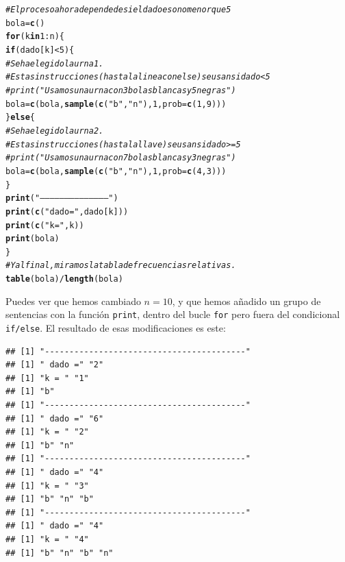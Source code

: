 \documentclass[10pt,a4paper]{article}\usepackage[]{graphicx}\usepackage[]{color}
\makeatletter
\newcommand{\hlnum}[1]{\textcolor[rgb]{0.686,0.059,0.569}{#1}}%
\newcommand{\hlstr}[1]{\textcolor[rgb]{0.192,0.494,0.8}{#1}}%
\newcommand{\hlcom}[1]{\textcolor[rgb]{0.678,0.584,0.686}{\textit{#1}}}%
\newcommand{\hlopt}[1]{\textcolor[rgb]{0,0,0}{#1}}%
\newcommand{\hlstd}[1]{\textcolor[rgb]{0.345,0.345,0.345}{#1}}%
\newcommand{\hlkwa}[1]{\textcolor[rgb]{0.161,0.373,0.58}{\textbf{#1}}}%
\newcommand{\hlkwb}[1]{\textcolor[rgb]{0.69,0.353,0.396}{#1}}%
\newcommand{\hlkwc}[1]{\textcolor[rgb]{0.333,0.667,0.333}{#1}}%
\newcommand{\hlkwd}[1]{\textcolor[rgb]{0.737,0.353,0.396}{\textbf{#1}}}%
\newenvironment{kframe}{%
 \def\at@end@of@kframe{}%
 \ifinner\ifhmode%
  \def\at@end@of@kframe{\end{minipage}}%
  \begin{minipage}{\columnwidth}%
 \fi\fi%
 \def\FrameCommand##1{\hskip\@totalleftmargin \hskip-\fboxsep
 \colorbox{shadecolor}{##1}\hskip-\fboxsep
     \hskip-\linewidth \hskip-\@totalleftmargin \hskip\columnwidth}%
 \MakeFramed {\advance\hsize-\width
   \@totalleftmargin\z@ \linewidth\hsize
   \@setminipage}}%
 {\par\unskip\endMakeFramed%
 \at@end@of@kframe}
\newenvironment{knitrout}{}{} %
\makeatother
\begin{document}
\begin{enumerate}
\begin{knitrout}
\begin{kframe}
\begin{alltt}
\hlcom{# El proceso ahora depende de si el dado es o no menor que 5}
\hlstd{bola}\hlkwb{=}\hlkwd{c}\hlstd{()}
\hlkwa{for}\hlstd{(k} \hlkwa{in} \hlnum{1}\hlopt{:}\hlstd{n)\{}
  \hlkwa{if}\hlstd{(dado[k]} \hlopt{<} \hlnum{5}\hlstd{)\{}
      \hlcom{#Se ha elegido la urna 1.}
      \hlcom{#Estas instrucciones (hasta la linea con else) se usan si dado<5}
      \hlcom{#print("Usamos una urna con 3 bolas blancas y 5 negras")}
      \hlstd{bola} \hlkwb{=} \hlkwd{c}\hlstd{(bola,} \hlkwd{sample}\hlstd{(}\hlkwd{c}\hlstd{(}\hlstr{"b"}\hlstd{,}\hlstr{"n"}\hlstd{),} \hlnum{1}\hlstd{,} \hlkwc{prob}\hlstd{=}\hlkwd{c}\hlstd{(}\hlnum{1}\hlstd{,}\hlnum{9}\hlstd{)) )}
  \hlstd{\}} \hlkwa{else} \hlstd{\{}
    \hlcom{#Se ha elegido la urna 2.}
    \hlcom{#Estas instrucciones (hasta la llave) se usan si dado>=5}
    \hlcom{#print("Usamos una urna con 7 bolas blancas y 3 negras")}
      \hlstd{bola} \hlkwb{=} \hlkwd{c}\hlstd{(bola,} \hlkwd{sample}\hlstd{(}\hlkwd{c}\hlstd{(}\hlstr{"b"}\hlstd{,}\hlstr{"n"}\hlstd{),} \hlnum{1}\hlstd{,} \hlkwc{prob}\hlstd{=}\hlkwd{c}\hlstd{(}\hlnum{4}\hlstd{,}\hlnum{3}\hlstd{)) )}
  \hlstd{\}}
  \hlkwd{print}\hlstd{(}\hlstr{"-----------------------------------------"}\hlstd{)}
  \hlkwd{print}\hlstd{(}\hlkwd{c}\hlstd{(}\hlstr{" dado ="}\hlstd{, dado[k]) )}
  \hlkwd{print}\hlstd{(}\hlkwd{c}\hlstd{(}\hlstr{"k = "}\hlstd{, k))}
  \hlkwd{print}\hlstd{(bola)}
\hlstd{\}}
\hlcom{# Y al final, miramos la tabla de frecuencias relativas.}
\hlkwd{table}\hlstd{(bola)} \hlopt{/} \hlkwd{length}\hlstd{(bola)}
\end{alltt}
\end{kframe}
\end{knitrout}
    Puedes ver que hemos cambiado $n=10$, y que hemos añadido un grupo de sentencias con la función {\tt print}, dentro del bucle {\tt for} pero fuera del condicional {\tt if/else}. El resultado de esas modificaciones es este:
\begin{knitrout}
\color{fgcolor}\begin{kframe}
\begin{verbatim}
## [1] "-----------------------------------------"
## [1] " dado =" "2"      
## [1] "k = " "1"   
## [1] "b"
## [1] "-----------------------------------------"
## [1] " dado =" "6"      
## [1] "k = " "2"   
## [1] "b" "n"
## [1] "-----------------------------------------"
## [1] " dado =" "4"      
## [1] "k = " "3"   
## [1] "b" "n" "b"
## [1] "-----------------------------------------"
## [1] " dado =" "4"      
## [1] "k = " "4"   
## [1] "b" "n" "b" "n"

\end{verbatim}
\end{kframe}
\end{knitrout}
\end{enumerate}
\end{document}
